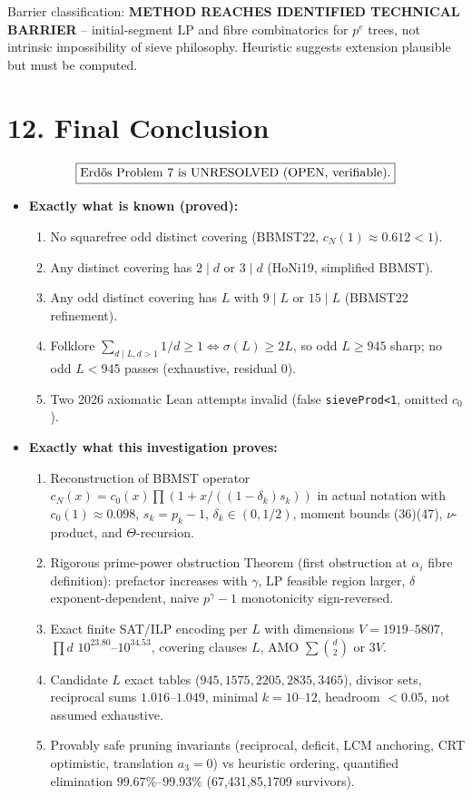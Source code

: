 \documentclass[11pt,a4paper]{article}
\theoremstyle{plain}
\theoremstyle{definition}
\theoremstyle{remark}
\newcommand{\cN}{c_{N}}
\newcommand{\cO}{c_{0}}
\begin{document}
Barrier classification: \textbf{METHOD REACHES IDENTIFIED TECHNICAL BARRIER} -- initial-segment LP and fibre combinatorics for $p^{e}$ trees, not intrinsic impossibility of sieve philosophy. Heuristic suggests extension plausible but must be computed.

\section{12. Final Conclusion}

\[
\boxed{\text{Erd\H{o}s Problem 7 is UNRESOLVED (OPEN, verifiable).}}
\]

\begin{itemize}
\item \textbf{Exactly what is known (proved):}
\begin{enumerate}
\item No squarefree odd distinct covering (BBMST22, $\cN(1)\approx0.612<1$).
\item Any distinct covering has $2\mid d$ or $3\mid d$ (HoNi19, simplified BBMST).
\item Any odd distinct covering has $L$ with $9\mid L$ or $15\mid L$ (BBMST22 refinement).
\item Folklore $\sum_{d\mid L,d>1}1/d\ge1\iff\sigma(L)\ge2L$, so odd $L\ge945$ sharp; no odd $L<945$ passes (exhaustive, residual $0$).
\item Two 2026 axiomatic Lean attempts invalid (false \texttt{sieveProd<1}, omitted $\cO$).
\end{enumerate}

\item \textbf{Exactly what this investigation proves:}
\begin{enumerate}
\item Reconstruction of BBMST operator $\cN(x)=\cO(x)\prod(1+x/((1-\delta_{k})s_{k}))$ in actual notation with $\cO(1)\approx0.098$, $s_{k}=p_{k}-1$, $\delta_{k}\in(0,1/2)$, moment bounds (36)(47), $\nu$-product, and $\Theta$-recursion.
\item Rigorous prime-power obstruction Theorem (first obstruction at $\alpha_{i}$ fibre definition): prefactor increases with $\gamma$, LP feasible region larger, $\delta$ exponent-dependent, naive $p^{\gamma}-1$ monotonicity sign-reversed.
\item Exact finite SAT/ILP encoding per $L$ with dimensions $V=1919$--$5807$, $\prod d$ $10^{23.80}$--$10^{34.53}$, covering clauses $L$, AMO $\sum\binom{d}{2}$ or $3V$.
\item Candidate $L$ exact tables ($945,1575,2205,2835,3465$), divisor sets, reciprocal sums $1.016$--$1.049$, minimal $k=10$--$12$, headroom $<0.05$, not assumed exhaustive.
\item Provably safe pruning invariants (reciprocal, deficit, LCM anchoring, CRT optimistic, translation $a_{3}=0$) vs heuristic ordering, quantified elimination $99.67\%$--$99.93\%$ (67,431,85,1709 survivors).
\end{enumerate}


\end{itemize}
\end{document}
